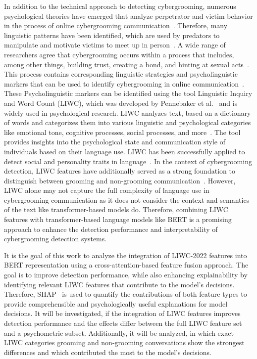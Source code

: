 In addition to the technical approach to detecting cybergrooming, numerous psychological theories have emerged that analyze perpetrator and victim behavior in the process of online cybergrooming communication~\cite{black2015linguistic, lorenzo2016understanding, oconnell2003typology}. Therefore, many linguistic patterns have been identified, which are used by predators to manipulate and motivate victims to meet up in person~\cite{chiangandgrant2017online, lorenzudus2017cause}. A wide range of researchers agree that cybergrooming occurs within a process that includes, among other things, building trust, creating a bond, and hinting at sexual acts~\cite{oconnell2003typology,lorenzudus2017cause,williamsmodel,chiangandgrant2017online}. This process contains corresponding linguistic strategies and psycholinguistic markers that can be used to identify cybergrooming in online communication~\cite{black2015linguistic,guo2023text,broome2020psycholinguistic}. These Psycholinguistic markers can be identified using the tool Linguistic Inquiry and Word Count (LIWC), which was developed by Pennebaker et al.~\cite{tausczik2010psychological} and is widely used in psychological research. LIWC analyzes text, based on a dictionary of words and categorizes them into various linguistic and psychological categories like emotional tone, cognitive processes, social processes, and more~\cite{pennebaker2022liwc}. The tool provides insights into the psychological state and communication style of individuals based on their language use. LIWC has been successfully applied to detect social and personality traits in language~\cite{tausczik2010psychological}. In the context of cybergrooming detection, LIWC features have additionally served as a strong foundation to distinguish between grooming and non-grooming communication~\cite{broome2020psycholinguistic,guo2023text,gupta2012characterizingpedophileconversationsinternet}. However, LIWC alone may not capture the full complexity of language use in cybergrooming communication as it does not consider the context and semantics of the text like transformer-based models do. Therefore, combining LIWC features with transformer-based language models like BERT is a promising approach to enhance the detection performance and interpretability of cybergrooming detection systems.

It is the goal of this work to analyze the integration of LIWC-2022 features into BERT representation using a cross-attention-based feature fusion approach. The goal is to improve detection performance, while also enhancing explainability by identifying relevant LIWC features that contribute to the model's decisions. Therefore, SHAP~\cite{lundberg2017shap} is used to quantify the contributions of both feature types to provide comprehensible and psychologically useful explanations for model decisions. It will be investigated, if the integration of LIWC features improves detection performance and the effects differ between the full LIWC feature set and a psychometric subset. Additionally, it will be analyzed, in which exact LIWC categories grooming and non-grooming conversations show the strongest differences and which contributed the most to the model's decisions.

